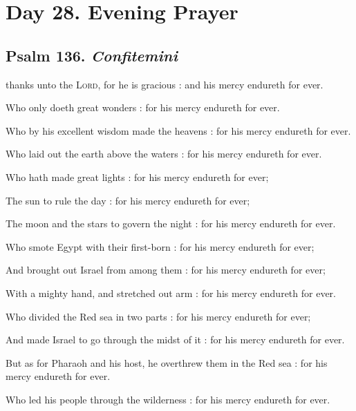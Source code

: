 \clearpage
\section*{Day 28. Evening Prayer}

\subsection{Psalm 136. \textit{Confitemini}}

 thanks unto the \textsc{Lord}, for he is gracious : and his mercy endureth for ever.\par
{}
Who only doeth great wonders : for his mercy endureth for ever.\par
{}Who by his excellent wisdom made the heavens : for his mercy endureth for ever.\par
{}Who laid out the earth above the waters : for his mercy endureth for ever.\par
{}Who hath made great lights : for his mercy endureth for ever;\par
{}The sun to rule the day : for his mercy endureth for ever;\par
{}The moon and the stars to govern the night : for his mercy endureth for ever.\par
{}Who smote Egypt with their first-born : for his mercy endureth for ever;\par
{}And brought out Israel from among them : for his mercy endureth for ever;\par
{}With a mighty hand, and stretched out arm : for his mercy endureth for ever.\par
{}Who divided the Red sea in two parts : for his mercy endureth for ever;\par
{}And made Israel to go through the midst of it : for his mercy endureth for ever.\par
{}But as for Pharaoh and his host, he overthrew them in the Red sea : for his mercy endureth for ever.\par
{}Who led his people through the wilderness : for his mercy endureth for ever.\par
